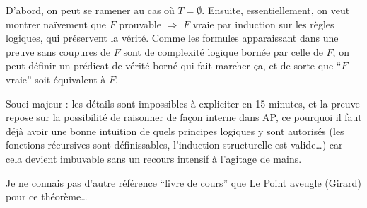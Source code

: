 \documentclass[a4paper, 11pt]{article}
\begin{document}
D'abord, on peut se ramener au cas où $T = \emptyset$. Ensuite, essentiellement,
on veut montrer naïvement que $F$ prouvable $\Rightarrow$ $F$ vraie par
induction sur les règles logiques, qui préservent la vérité. Comme les formules
apparaissant dans une preuve sans coupures de $F$ sont de complexité logique
bornée par celle de $F$, on peut définir un prédicat de vérité borné qui fait
marcher ça, et de sorte que \enquote{$F$ vraie} soit équivalent à $F$.

Souci majeur : les détails sont impossibles à expliciter en 15 minutes, et la
preuve repose sur la possibilité de raisonner de façon interne dans AP, ce
pourquoi il faut déjà avoir une bonne intuition de quels principes logiques y
sont autorisés (les fonctions récursives sont définissables, l'induction
structurelle est valide…) car cela devient imbuvable sans un recours intensif à
l'agitage de mains.

Je ne connais pas d'autre référence \enquote{livre de cours} que Le Point
aveugle (Girard) pour ce théorème…
\end{document}
